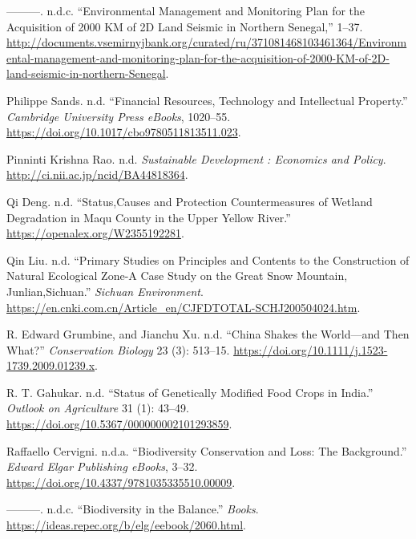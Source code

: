 \begin{CSLReferences}{1}{0}
---------. n.d.c. {``Environmental Management and Monitoring Plan for
the Acquisition of 2000 KM of 2D Land Seismic in Northern Senegal,''}
1--37.
\url{http://documents.vsemirnyjbank.org/curated/ru/371081468103461364/Environmental-management-and-monitoring-plan-for-the-acquisition-of-2000-KM-of-2D-land-seismic-in-northern-Senegal}.

Philippe Sands. n.d. {``Financial Resources, Technology and Intellectual
Property.''} \emph{Cambridge University Press eBooks}, 1020--55.
\url{https://doi.org/10.1017/cbo9780511813511.023}.

Pinninti Krishna Rao. n.d. \emph{Sustainable Development : Economics and
Policy}. \url{http://ci.nii.ac.jp/ncid/BA44818364}.

Qi Deng. n.d. {``Status,Causes and Protection Countermeasures of Wetland
Degradation in Maqu County in the Upper Yellow River.''}
\url{https://openalex.org/W2355192281}.

Qin Liu. n.d. {``Primary Studies on Principles and Contents to the
Construction of Natural Ecological Zone-A Case Study on the Great Snow
Mountain, Junlian,Sichuan.''} \emph{Sichuan Environment}.
\url{https://en.cnki.com.cn/Article_en/CJFDTOTAL-SCHJ200504024.htm}.

R. Edward Grumbine, and Jianchu Xu. n.d. {``China Shakes the World---and
Then What?''} \emph{Conservation Biology} 23 (3): 513--15.
\url{https://doi.org/10.1111/j.1523-1739.2009.01239.x}.

R. T. Gahukar. n.d. {``Status of Genetically Modified Food Crops in
India.''} \emph{Outlook on Agriculture} 31 (1): 43--49.
\url{https://doi.org/10.5367/000000002101293859}.

Raffaello Cervigni. n.d.a. {``Biodiversity Conservation and Loss: The
Background.''} \emph{Edward Elgar Publishing eBooks}, 3--32.
\url{https://doi.org/10.4337/9781035335510.00009}.

---------. n.d.c. {``Biodiversity in the Balance.''} \emph{Books}.
\url{https://ideas.repec.org/b/elg/eebook/2060.html}.


\end{CSLReferences}
